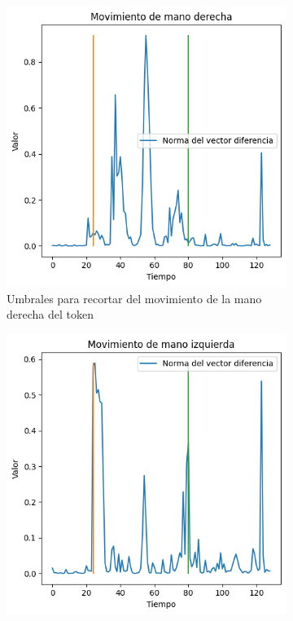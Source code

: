 \begin{figure}[t]
\centering
	\begin{subfigure}[t]{0.3\textwidth}
	\centering
		\includegraphics[align=t,width=0.9\linewidth, height =0.9\linewidth]{Graphics/umbrales_recorte_rhand_aborto.png}
		\caption{ Umbrales para recortar del movimiento de la mano derecha del token }
		\label{f:rhand_movediff_amar}
	\end{subfigure}
	\begin{subfigure}[t]{0.3\textwidth}
	\centering
		\includegraphics[align=t,width=0.9\linewidth, height =0.9\linewidth]{Graphics/umbrales_recorte_lhand_aborto.png}

\end{subfigure}
\end{figure}
